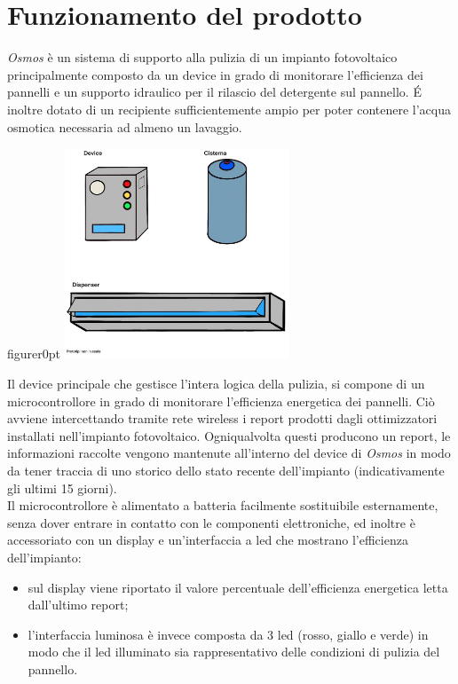 \documentclass[a4paper, 12pt]{article}
\begin{document}
	\section{Funzionamento del prodotto}
	\emph{Osmos} è un sistema di supporto alla pulizia di un impianto fotovoltaico principalmente composto da un device in grado di monitorare l'efficienza dei pannelli 
	e un supporto idraulico per il rilascio del detergente sul pannello. \'E inoltre dotato di un recipiente sufficientemente ampio per poter contenere l'acqua osmotica necessaria ad almeno un lavaggio.\\
	\begin{wrapfloat}{figure}{r}{0pt}
		\includegraphics[width=0.5\textwidth]{Images/prototipo.jpg}
	\end{wrapfloat}
	Il device principale che gestisce l'intera logica della pulizia, si compone di un microcontrollore in grado di monitorare l'efficienza energetica dei pannelli. Ciò avviene intercettando tramite rete wireless i report prodotti dagli ottimizzatori installati nell'impianto fotovoltaico. Ogniqualvolta questi producono un report, le informazioni raccolte vengono mantenute all'interno del device di \emph{Osmos} in modo da tener traccia di uno storico dello stato recente dell'impianto (indicativamente gli ultimi 15 giorni).\\
	Il microcontrollore è alimentato a batteria facilmente sostituibile esternamente, senza dover entrare in contatto con le componenti elettroniche, ed inoltre è accessoriato con un display e un'interfaccia a led che mostrano l'efficienza dell'impianto:
	\begin{itemize}
		\item sul display viene riportato il valore percentuale dell'efficienza energetica letta dall'ultimo report;
		\item l'interfaccia luminosa è invece composta da 3 led (rosso, giallo e verde) in modo che il led illuminato sia rappresentativo delle condizioni di pulizia del pannello.
	\end{itemize}
\end{document}
